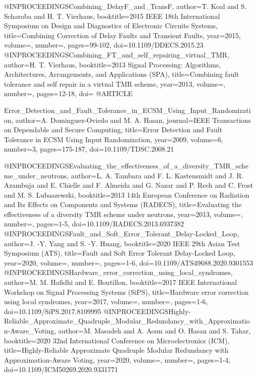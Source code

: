 @INPROCEEDINGS{Combining_DelayF_and_TransF,
	author={T. {Koal} and S. {Scharoba} and H. T. {Vierhaus}},
	booktitle={2015 IEEE 18th International Symposium on Design and Diagnostics of Electronic Circuits   Systems}, 
	title={Combining Correction of Delay Faults and Transient Faults}, 
	year={2015},
	volume={},
	number={},
	pages={99-102},	
	doi={10.1109/DDECS.2015.23}
}
@INPROCEEDINGS{Combining_FT_and_self_repairing_virtual_TMR,
	author={H. T. {Vierhaus}},
	booktitle={2013 Signal Processing: Algorithms, Architectures, Arrangements, and Applications (SPA)}, 
	title={Combining fault tolerance and self repair in a virtual TMR scheme}, 
	year={2013},
	volume={},
	number={},
	pages={12-18},	
	doi={}
}
@ARTICLE{Error_Detection_and_Fault_Tolerance_in_ECSM_Using_Input_Randomization,
	author={A. {Dominguez-Oviedo} and M. A. {Hasan}},
	journal={IEEE Transactions on Dependable and Secure Computing}, 
	title={Error Detection and Fault Tolerance in ECSM Using Input Randomization}, 
	year={2009},
	volume={6},
	number={3},
	pages={175-187},	
	doi={10.1109/TDSC.2008.21}

}
@INPROCEEDINGS{Evaluating_the_effectiveness_of_a_diversity_TMR_scheme_under_neutrons,
	author={L. A. {Tambara} and F. L. {Kastensmidt} and J. R. {Azambuja} and E. {Chielle} and F. {Almeida} and G. {Nazar} and P. {Rech} and C. {Frost} and M. S. {Lubaszewski}},
	booktitle={2013 14th European Conference on Radiation and Its Effects on Components and Systems (RADECS)}, 
	title={Evaluating the effectiveness of a diversity TMR scheme under neutrons},
	year={2013},
	volume={},
	number={},
	pages={1-5},	
	doi={10.1109/RADECS.2013.6937382}
}
@INPROCEEDINGS{Fault_and_Soft_Error_Tolerant_Delay-Locked_Loop,
	author={J. -Y. {Yang} and S. -Y. {Huang}},
	booktitle={2020 IEEE 29th Asian Test Symposium (ATS)}, 
	title={Fault and Soft Error Tolerant Delay-Locked Loop}, 
	year={2020},
	volume={},
	number={},
	pages={1-6},	
	doi={10.1109/ATS49688.2020.9301553}
}
@INPROCEEDINGS{Hardware_error_correction_using_local_syndromes,
	author={M. M. {Hafidhi} and E. {Boutillon}},
	booktitle={2017 IEEE International Workshop on Signal Processing Systems (SiPS)}, 
	title={Hardware error correction using local syndromes}, 
	year={2017},
	volume={},
	number={},
	pages={1-6},	
	doi={10.1109/SiPS.2017.8109995}
}
@INPROCEEDINGS{Highly-Reliable_Approximate_Quadruple_Modular_Redundancy_with_Approximation-Aware_Voting,
	author={M. {Masadeh} and A. {Aoun} and O. {Hasan} and S. {Tahar}},
	booktitle={2020 32nd International Conference on Microelectronics (ICM)}, 
	title={Highly-Reliable Approximate Quadruple Modular Redundancy with Approximation-Aware Voting}, 
	year={2020},
	volume={},
	number={},
	pages={1-4},	
	doi={10.1109/ICM50269.2020.9331771}
}

